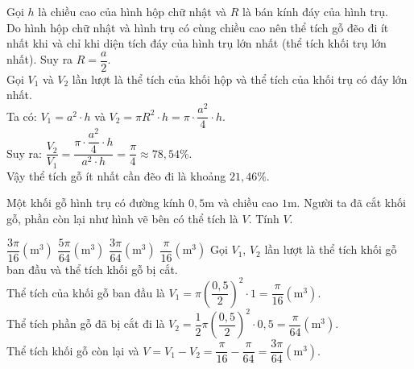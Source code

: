 \begin{ex}
{		Gọi $ h$ là chiều cao của hình hộp chữ nhật và $ R$ là bán kính đáy của hình trụ.\\
		Do hình hộp chữ nhật và hình trụ có cùng chiều cao nên thể tích gỗ đẽo đi ít nhất khi và chỉ khi diện tích đáy của hình trụ lớn nhất (thể tích khối trụ lớn nhất). Suy ra $ R=\dfrac{a}{2}$.\\
		Gọi $V_1$ và $V_2$ lần lượt là thể tích của khối hộp và thể tích của khối trụ có đáy lớn nhất.\\
		Ta có: $V_1=a^2\cdot h$ và $V_2=\pi{R^2}\cdot h=\pi\cdot\dfrac{a^2}{4}\cdot h$.\\
		Suy ra: $\dfrac{V_2}{V_1}=\dfrac{\pi\cdot\dfrac{a^2}{4}\cdot h}{a^2\cdot h}=\dfrac{\pi}{4}\approx 78{,}54\%$.\\
		Vậy thể tích gỗ ít nhất cần đẽo đi là khoảng $21{,}46\%$.}
\end{ex}
\begin{ex} %
	Một khối gỗ hình trụ có đường kính $0{,}5\text{m}$ và chiều cao $1\text{m}$. Người ta đã cắt khối gỗ, phần còn lại như hình vẽ bên có thể tích là $V$. Tính $V$.
	\begin{center}
	\end{center}
	\choice
	{$\dfrac{3\pi}{16}$$\left(\text{m}^3\right)$}
	{$\dfrac{5\pi}{64}$$\left(\text{m}^3\right)$}
	{\True $\dfrac{3\pi}{64}$$\left(\text{m}^3\right)$}
	{$\dfrac{\pi}{16}$$\left(\text{m}^3\right)$}
	\loigiai
	{Gọi $V_1$, $V_2$ lần lượt là thể tích khối gỗ ban đầu và thể tích khối gỗ bị cắt.\\
		Thể tích của khối gỗ ban đầu là $V_1=\pi{\left(\dfrac{0{,}5}{2}\right)^2}\cdot 1=\dfrac{\pi}{16}$$\left(\text{m}^3\right)$.\\
		Thể tích phần gỗ đã bị cắt đi là $V_2=\dfrac{1}{2}\pi{\left(\dfrac{0{,}5}{2}\right)^2}\cdot0{,}5=\dfrac{\pi}{64}$$\left(\text{m}^3\right)$.\\
		Thể tích khối gỗ còn lại và $ V=V_1-V_2=\dfrac{\pi}{16}-\dfrac{\pi}{64}=\dfrac{3\pi}{64}$$\left(\text{m}^3\right)$.}
\end{ex}
